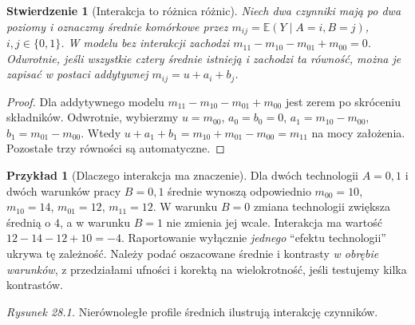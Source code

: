 \documentclass[11pt,a4paper,oneside]{report}
\numberwithin{equation}{chapter}
\theoremstyle{plain}
\newtheorem{stwierdzenie}[twierdzenie]{Stwierdzenie}
\theoremstyle{definition}
\newtheorem{przyklad}{Przykład}[chapter]
\theoremstyle{remark}
\newcommand{\E}{\mathbb E}
\begin{document}
\begin{stwierdzenie}[Interakcja to różnica różnic]\label{prop:interaction-did}
Niech dwa czynniki mają po dwa poziomy i oznaczmy średnie komórkowe przez $m_{ij}=\E(Y\mid A=i,B=j)$, $i,j\in\{0,1\}$. W modelu bez interakcji zachodzi $m_{11}-m_{10}-m_{01}+m_{00}=0$. Odwrotnie, jeśli wszystkie cztery średnie istnieją i zachodzi ta równość, można je zapisać w postaci addytywnej $m_{ij}=u+a_i+b_j$.
\end{stwierdzenie}
\begin{proof}
Dla addytywnego modelu $m_{11}-m_{10}-m_{01}+m_{00}$ jest zerem po skróceniu składników. Odwrotnie, wybierzmy $u=m_{00}$, $a_0=b_0=0$, $a_1=m_{10}-m_{00}$, $b_1=m_{01}-m_{00}$. Wtedy $u+a_1+b_1=m_{10}+m_{01}-m_{00}=m_{11}$ na mocy założenia. Pozostałe trzy równości są automatyczne.
\end{proof}

\begin{przyklad}[Dlaczego interakcja ma znaczenie]\label{ex:interaction-practical}
Dla dwóch technologii $A=0,1$ i dwóch warunków pracy $B=0,1$ średnie wynoszą odpowiednio $m_{00}=10$, $m_{10}=14$, $m_{01}=12$, $m_{11}=12$. W warunku $B=0$ zmiana technologii zwiększa średnią o $4$, a w warunku $B=1$ nie zmienia jej wcale. Interakcja ma wartość $12-14-12+10=-4$. Raportowanie wyłącznie \emph{jednego} ``efektu technologii'' ukrywa tę zależność. Należy podać oszacowane średnie i kontrasty \emph{w obrębie warunków}, z przedziałami ufności i korektą na wielokrotność, jeśli testujemy kilka kontrastów.
\end{przyklad}

\begin{center}

{\small\emph{Rysunek 28.1.} Nierównoległe profile średnich ilustrują interakcję czynników.}
\end{center}
\end{document}
